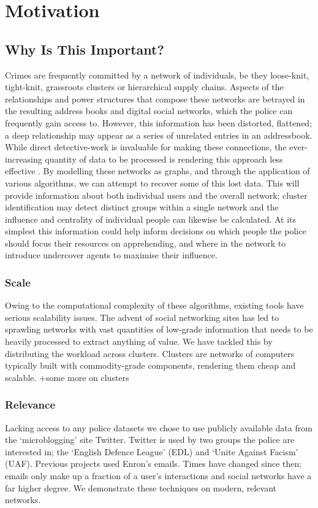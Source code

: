 \chapter{Motivation}

\section{Why Is This Important?}
Crimes are frequently committed by a network of individuals, be they loose-knit,
tight-knit, grassroots clusters or hierarchical supply chains. Aspects of the
relationships and power structures that compose these networks are betrayed in
the resulting address books and digital social networks, which the police can
frequently gain access to. However, this information has been distorted,
flattened; a deep relationship may appear as a series of unrelated entries in an
addressbook. While direct detective-work is invaluable for making these
connections, the ever-increasing quantity of data to be processed is rendering
this approach less effective . By modelling these networks as graphs, and
through the application of various algorithms, we can attempt to recover some of
this lost data. This will provide information about both individual users and
the overall network; cluster identification may detect distinct groups within a
single network and the influence and centrality of individual people can
likewise be calculated. At its simplest this information could help inform
decisions on which people the police should focus their resources on
apprehending, and where in the network to introduce undercover agents to
maximise their influence. 

\subsection{Scale}
Owing to the computational complexity of these algorithms, existing tools have
serious scalability issues. The advent of social networking sites has led to
sprawling networks with vast quantities of low-grade information that needs to
be heavily processed to extract anything of value. We have tackled this by
distributing the workload across clusters. Clusters are networks of computers
typically built with commodity-grade components, rendering them cheap and
scalable.
+some more on clusters

\subsection{Relevance}
Lacking access to any police datasets we chose to use publicly available data
from the `microblogging' site Twitter. Twitter is used by two groups the police
are interested in; the `English Defence League' (EDL) and `Unite Against Facism'
(UAF). Previous projects used Enron's emails. Times have changed since then;
emails only make up a fraction of a user's interactions and social networks have
a far higher degree. We demonstrate these techniques on modern, relevant
networks.

